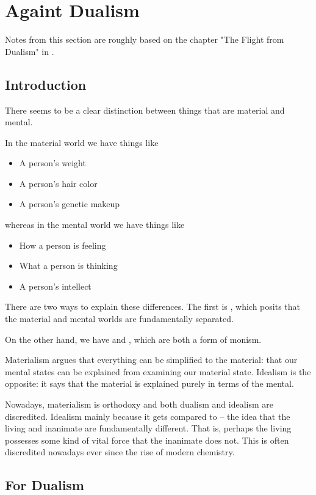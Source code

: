 \section{Againt Dualism}
\label{against-dualism}

Notes from this section are roughly based on the chapter "The Flight from Dualism" in \cite{pomac}.

\subsection{Introduction}

There seems to be a clear distinction between things that are material and mental.

In the material world we have things like
\begin{itemize}
    \item A person's weight
    \item A person's hair color
    \item A person's genetic makeup
\end{itemize}
whereas in the mental world we have things like
\begin{itemize}
    \item How a person is feeling
    \item What a person is thinking
    \item A person's intellect
\end{itemize}

There are two ways to explain these differences. The first is , which posits that the material and mental worlds are fundamentally separated.

On the other hand, we have  and , which are both a form of monism.

Materialism argues that everything can be simplified to the material: that our mental states can be explained from examining our material state. Idealism is the opposite: it says that the material is explained purely in terms of the mental.

Nowadays, materialism is orthodoxy and both dualism and idealism are discredited. Idealism mainly because it gets compared to  -- the idea that the living and inanimate are fundamentally different. That is, perhaps the living possesses some kind of vital force that the inanimate does not. This is often discredited nowadays ever since the rise of modern chemistry.

\subsection{For Dualism}

